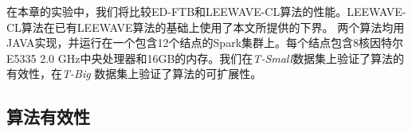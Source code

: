 在本章的实验中，我们将比较ED-FTB和LEEWAVE-CL算法的性能。LEEWAVE-CL算法在已有LEEWAVE算法的基础上使用了本文所提供的下界。
两个算法均用JAVA实现，并运行在一个包含12个结点的Spark集群上。每个结点包含8核因特尔E5335 2.0 GHz中央处理器和16GB的内存。我们在\emph{T-Small}数据集上验证了算法的有效性，在\emph{T-Big} 数据集上验证了算法的可扩展性。


\subsection{算法有效性}

